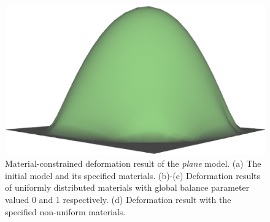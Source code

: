 \begin{figure} [htbp]
{\begin{minipage}[b]{0.32\textwidth}
      \centering
      \includegraphics[scale=0.20]{figs/f5.8.ver10-iso-1.eps}
    \end{minipage}}
  \caption{Material-constrained deformation result of the \textit{plane} model. (a) The initial model and its specified materials. (b)-(c) Deformation results of uniformly distributed materials with global balance parameter valued 0 and 1 respectively. (d) Deformation result with the specified non-uniform materials.}
  \label{fig:deformplane} %
\end{figure}

